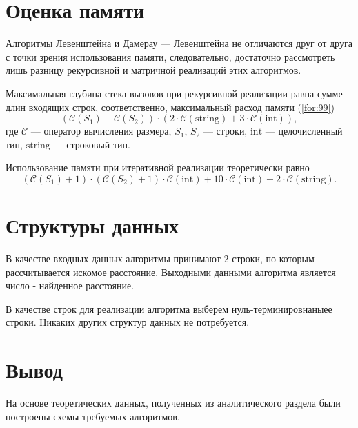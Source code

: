     \section{Оценка памяти}
    
        Алгоритмы Левенштейна и Дамерау — Левенштейна не отличаются друг от друга с точки зрения использования памяти, следовательно, достаточно рассмотреть лишь разницу рекурсивной и матричной реализаций этих алгоритмов.
        
        Максимальная глубина стека вызовов при рекурсивной реализации равна сумме длин входящих строк, соответственно, максимальный расход памяти (\ref{for:99})
        \begin{equation}
        (\mathcal{C}(S_1) + \mathcal{C}(S_2)) \cdot (2 \cdot \mathcal{C}\mathrm{(string)} + 3 \cdot \mathcal{C}\mathrm{(int)}),
        \label{for:99}
        \end{equation}
        где $\mathcal{C}$ — оператор вычисления размера, $S_1$, $S_2$ — строки, $\mathrm{int}$ — целочисленный тип, $\mathrm{string}$ — строковый тип.
        
        Использование памяти при итеративной реализации теоретически равно
        \begin{equation}
        (\mathcal{C}(S_1) + 1) \cdot (\mathcal{C}(S_2) + 1) \cdot \mathcal{C}\mathrm{(int)} + 10\cdot \mathcal{C}\mathrm{(int)} + 2 \cdot \mathcal{C}\mathrm{(string)}.
        \end{equation}

    \section{Структуры данных}
    
        В качестве входных данных алгоритмы принимают 2 строки, по которым рассчитывается искомое расстояние. Выходными данными алгоритма является число - найденное расстояние.
        
        В качестве строк для реализации алгоритма выберем нуль-терминировнаныее строки. Никаких других структур данных не потребуется.
        
    \section*{Вывод}
    
        На основе теоретических данных, полученных из аналитического раздела были построены схемы требуемых алгоритмов.